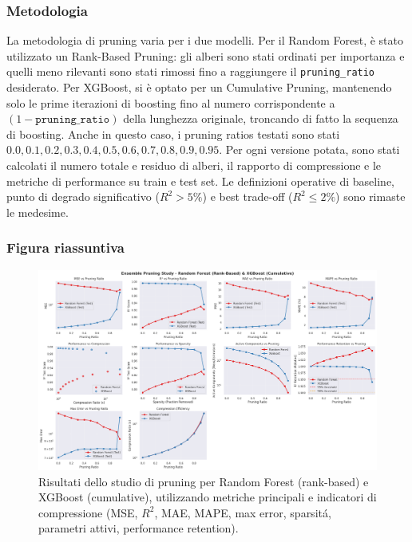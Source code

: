 \documentclass[a4paper,12pt]{report}
\begin{document}
	\subsubsection{Metodologia}
	La metodologia di pruning varia per i due modelli. Per il Random Forest, è stato utilizzato un Rank-Based Pruning: gli alberi sono stati ordinati per importanza e quelli meno rilevanti sono stati rimossi fino a raggiungere il \texttt{pruning\_ratio} desiderato. Per XGBoost, si è optato per un Cumulative Pruning, mantenendo solo le prime iterazioni di boosting fino al numero corrispondente a \((1 - \texttt{pruning\_ratio})\) della lunghezza originale, troncando di fatto la sequenza di boosting. Anche in questo caso, i pruning ratios testati sono stati ${0.0,0.1,0.2,0.3,0.4,0.5,0.6,0.7,0.8,0.9,0.95}$. Per ogni versione potata, sono stati calcolati il numero totale e residuo di alberi, il rapporto di compressione e le metriche di performance su train e test set. Le definizioni operative di baseline, punto di degrado significativo ($R^2 >5\%$) e best trade-off ($R^2 \le 2\%$) sono rimaste le medesime.
	
	\subsubsection{Figura riassuntiva}
	\begin{figure}[H]
		\centering
		\includegraphics[width=\textwidth]{img/abl_xgbvsrf_car.png}
		\caption{Risultati dello studio di pruning per Random Forest (rank-based) e XGBoost (cumulative), utilizzando metriche principali e indicatori di compressione (MSE, \(R^2\), MAE, MAPE, max error, sparsitá, parametri attivi, performance retention).}
	\end{figure}
	
\end{document}
